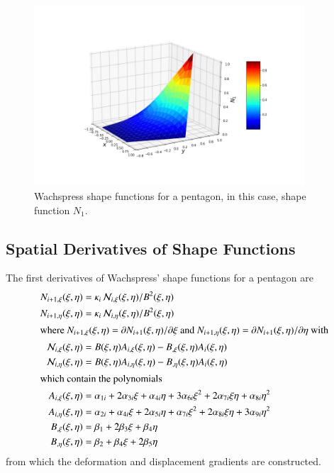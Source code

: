 \begin{figure}
	\centering
	\includegraphics[width=0.9\textwidth]{figures/shapeFunction.jpg}
	\caption{Wachspress shape functions for a pentagon, in this case, shape function $N_1$.}
	\label{figShapeFuntion}
\end{figure}

\subsection{Spatial Derivatives of Shape Functions}

The first derivatives of Wachspress' shape functions for a pentagon are
\begin{subequations}
    \label{shapeFunctionGradients}
	\begin{align}
	N_{i+1,\xi} (\xi, \eta) & = \kappa_i \, \mathcal{N}_{i,\xi}(\xi, \eta) /
	B^2(\xi, \eta) \\
	N_{i+1,\eta} (\xi, \eta) & = \kappa_i \, \mathcal{N}_{i,\eta}(\xi, \eta) /
	B^2(\xi, \eta) \\
	\intertext{where $N_{i+1,\xi}  (\xi, \eta) = \partial N_{i+1} (\xi, \eta) / \partial \xi$ and $N_{i+1,\eta} (\xi, \eta) = \partial N_{i+1} (\xi, \eta) / \partial \eta$ with}
	\mathcal{N}_{i,\xi} (\xi,\eta) & = B(\xi, \eta) A_{i,\xi} (\xi, \eta) -
	B_{,\xi} (\xi, \eta) A_i (\xi, \eta) \\
	\mathcal{N}_{i,\eta} (\xi,\eta) & = B(\xi, \eta) A_{i,\eta} (\xi, \eta) - 
	B_{,\eta} (\xi, \eta) A_i (\xi, \eta) \\
	\intertext{which contain the polynomials}
	A_{i,\xi} (\xi, \eta) & = \alpha_{1i} + 2 \alpha_{3i} \xi + \alpha_{4i} \eta +
	3 \alpha_{6i} \xi^2 + 2 \alpha_{7i} \xi \eta + \alpha_{8i} \eta^2
	\label{shapeFnGradXiNum} \\
	A_{i,\eta} (\xi, \eta) & = \alpha_{2i} + \alpha_{4i} \xi + 2 \alpha_{5i} \eta + 
	\alpha_{7i} \xi^2 + 2 \alpha_{8i} \xi\eta + 3 \alpha_{9i} \eta^2 
	\label{shapeFnGradEtaNum} \\
	B_{,\xi} (\xi, \eta) & = \beta_1 + 2 \beta_3 \xi + \beta_4 \eta
	\label{shapeFnGradXiDenom} \\
	B_{,\eta} (\xi, \eta) & = \beta_2 + \beta_4 \xi + 2 \beta_5 \eta 
	\label{shapeFnGradEtaDenom}
	\end{align}
\end{subequations}
from which the deformation and displacement gradients are constructed.

